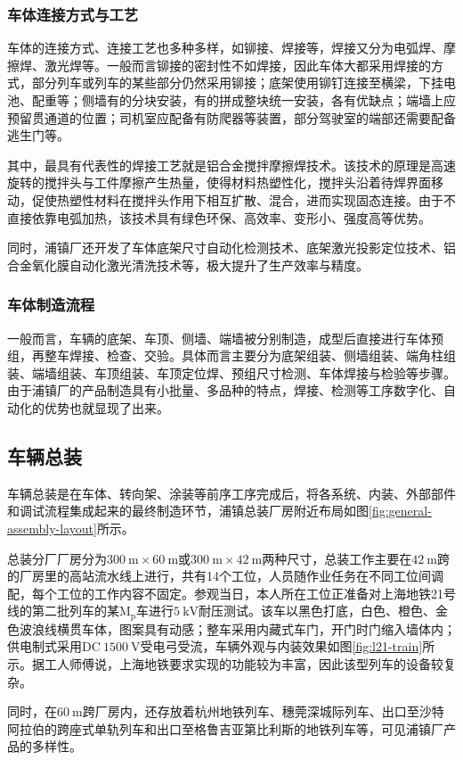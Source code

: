 \subsubsection{车体连接方式与工艺}
车体的连接方式、连接工艺也多种多样，如铆接、焊接等，焊接又分为电弧焊、摩擦焊、激光焊等。一般而言铆接的密封性不如焊接，因此车体大都采用焊接的方式，部分列车或列车的某些部分仍然采用铆接；底架使用铆钉连接至横梁，下挂电池、配重等；侧墙有的分块安装，有的拼成整块统一安装，各有优缺点；端墙上应预留贯通道的位置；司机室应配备有防爬器等装置，部分驾驶室的端部还需要配备逃生门等。\par{}
其中，最具有代表性的焊接工艺就是铝合金搅拌摩擦焊技术。该技术的原理是高速旋转的搅拌头与工件摩擦产生热量，使得材料热塑性化，搅拌头沿着待焊界面移动，促使热塑性材料在搅拌头作用下相互扩散、混合，进而实现固态连接。由于不直接依靠电弧加热，该技术具有绿色环保、高效率、变形小、强度高等优势。\par{}
同时，浦镇厂还开发了车体底架尺寸自动化检测技术、底架激光投影定位技术、铝合金氧化膜自动化激光清洗技术等，极大提升了生产效率与精度。\par{}

\subsubsection{车体制造流程}
一般而言，车辆的底架、车顶、侧墙、端墙被分别制造，成型后直接进行车体预组，再整车焊接、检查、交验。具体而言主要分为底架组装、侧墙组装、端角柱组装、端墙组装、车顶组装、车顶定位焊、预组尺寸检测、车体焊接与检验等步骤。由于浦镇厂的产品制造具有小批量、多品种的特点，焊接、检测等工序数字化、自动化的优势也就显现了出来。\par{}

\subsection{车辆总装}
车辆总装是在车体、转向架、涂装等前序工序完成后，将各系统、内装、外部部件和调试流程集成起来的最终制造环节，浦镇总装厂房附近布局如图\ref{fig:general-assembly-layout}所示。\par{}
总装分厂厂房分为$300~\mathrm{m}\times60~\mathrm{m}$或$300~\mathrm{m}\times42~\mathrm{m}$两种尺寸，总装工作主要在$42~\mathrm{m}$跨的厂房里的高站流水线上进行，共有14个工位，人员随作业任务在不同工位间调配，每个工位的工作内容不固定。参观当日，本人所在工位正准备对上海地铁21号线的第二批列车的某$\mathrm{M_p}$车进行$5~\mathrm{kV}$耐压测试。该车以黑色打底，白色、橙色、金色波浪线横贯车体，图案具有动感；整车采用内藏式车门，开门时门缩入墙体内；供电制式采用$\mathrm{DC}~1500~\mathrm{V}$受电弓受流，车辆外观与内装效果如图\ref{fig:l21-train}所示。据工人师傅说，上海地铁要求实现的功能较为丰富，因此该型列车的设备较复杂。\par{}
同时，在$60~\mathrm{m}$跨厂房内，还存放着杭州地铁列车、穗莞深城际列车、出口至沙特阿拉伯的跨座式单轨列车和出口至格鲁吉亚第比利斯的地铁列车等，可见浦镇厂产品的多样性。

